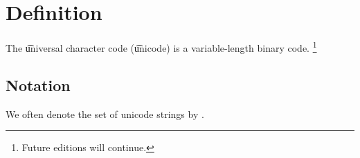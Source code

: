 
\section*{Definition}

The \t{universal character code} (\t{unicode}) is a variable-length binary code.
    \ifhmode\unskip\fi\footnote{
Future editions will continue.
    }

\subsection*{Notation}

We often denote the set of unicode strings by \ustring.

\blankpage